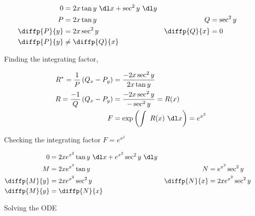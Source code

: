 \begin{enumerate}
          \begin{align}
              0            & = 2x \tan y\ \dl x + \sec ^{2}y\ \dl y   \\
              P            & = 2x \tan y                            &
              Q            & = \sec ^{2}y                             \\
              \diffp{P}{y} & = 2x \sec^{2}y                         &
              \diffp{Q}{x} & = 0                                      \\
              \diffp{P}{y} & \neq \diffp{Q}{x}
          \end{align}

          Finding the integrating factor,

          \begin{align}
              R^{*} = \frac{1}{P} \left( Q_{x} - P_{y}
              \right) & = \frac{- 2x \sec ^{2}y}{2x \tan y}                 \\
              R = \frac{-1}{Q}\left( Q_{x} - P_{y}
              \right) & = \frac{- 2x \sec ^{2}y}{- \sec ^{2} y}  = R(x)     \\
              F       & = \exp \left( \int\ R(x)\ \dl x \right) = e^{x^{2}}
          \end{align}

          Checking the integrating factor $ F = e^{x^{2}} $

          \begin{align}
              0            & = 2x e^{x^{2}} \tan y\ \dl x + e^{x^{2}} \sec ^{2} y
              \ \dl y                                                               \\
              M            & = 2x e^{x^{2}} \tan y                                &
              N            & =  e^{x^{2}} \sec ^{2} y                               \\
              \diffp{M}{y} & = 2x e^{x^{2}} \sec ^{2} y                           &
              \diffp{N}{x} & = 2x e^{x^{2}} \sec ^{2} y                             \\
              \diffp{M}{y} & = \diffp{N}{x}
          \end{align}

          Solving the ODE


\end{enumerate}
